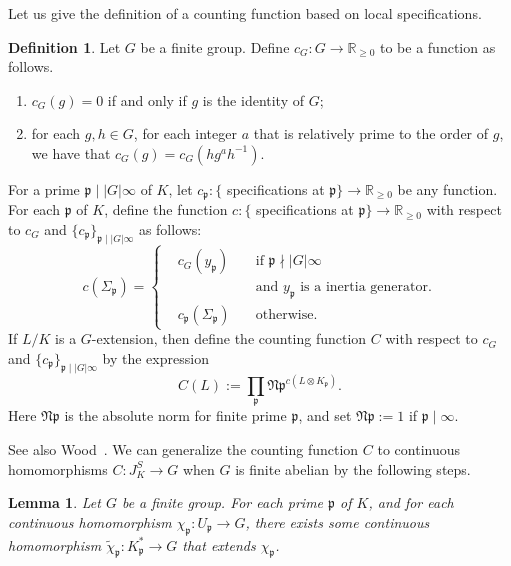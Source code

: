\documentclass{amsart}
\numberwithin{equation}{section}
\theoremstyle{plain}
\newtheorem{lemma}[theorem]{Lemma}
\theoremstyle{definition}
\newtheorem{definition}[theorem]{Definition}
\theoremstyle{remark}
\begin{document}
Let us give the definition of a counting function based on local specifications.
\begin{definition}\label{def: product of ramified primes}
	Let $G$ be a finite group.
	Define $c_G:G\to\mathbb{R}_{\geq0}$ to be a function as follows.
	\begin{enumerate}
		\item $c_G(g)=0$ if and only if $g$ is the identity of $G$;
		\item for each $g,h\in G$, for each integer $a$ that is relatively prime to the order of $g$, we have that $c_G(g)=c_G(hg^ah^{-1})$.
	\end{enumerate} 
	For a prime $\mathfrak{p}\mid\lvert G\rvert\infty$ of $K$, let $c_{\mathfrak{p}}:\{$ specifications at $\mathfrak{p}\}\to\mathbb{R}_{\geq0}$ be any function.
	For each $\mathfrak{p}$ of $K$, define the function $c:\{$ specifications at $\mathfrak{p}\}\to\mathbb{R}_{\geq0}$ with respect to $c_G$ and $\{c_{\mathfrak{p}}\}_{\mathfrak{p}\mid\lvert G\rvert\infty}$ as follows:
	\begin{equation*}
		c(\Sigma_{\mathfrak{p}})=\left\{
		\begin{aligned}
			&c_G(y_{\mathfrak{p}})\quad&\text{if }\mathfrak{p}\nmid\lvert G\rvert\infty
			\\
			&&\text{and }y_{\mathfrak{p}}\text{ is a inertia generator}.
			\\
			&c_{\mathfrak{p}}(\Sigma_{\mathfrak{p}})\quad&\text{otherwise.}
		\end{aligned}\right.
	\end{equation*}
	If $L/K$ is a $G$-extension, then define the counting function $C$ with respect to $c_G$ and $\{c_{\mathfrak{p}}\}_{\mathfrak{p}\mid\lvert G\rvert\infty}$ by the expression
	\begin{equation*}
		C(L):=\prod_{\mathfrak{p}}\mathfrak{Np}^{c(L\otimes K_{\mathfrak{p}})}.
	\end{equation*}
	Here $\mathfrak{Np}$ is the absolute norm for finite prime $\mathfrak{p}$, and set $\mathfrak{Np}:=1$ if $\mathfrak{p}\mid\infty$.
\end{definition}
See also Wood~\cite[Section 2]{wood2010probabilities}.
We can generalize the counting function $C$ to continuous homomorphisms $C:J_K^S\to G$ when $G$ is finite abelian by the following steps.
\begin{lemma}\label{lemma: extension of local map}
    Let $G$ be a finite group.
    For each prime $\mathfrak{p}$ of $K$, and for each continuous homomorphism $\chi_{\mathfrak{p}}:U_{\mathfrak{p}}\to G$, there exists some continuous homomorphism $\tilde{\chi}_{\mathfrak{p}}:K_{\mathfrak{p}}^*\to G$ that extends $\chi_{\mathfrak{p}}$.
\end{lemma}
\end{document}
